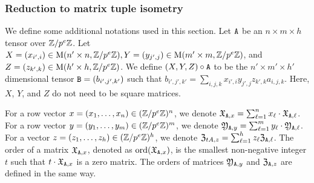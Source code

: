 \subsubsection{Reduction to matrix tuple isometry}

We define some additional notations used in this section. 
Let $\mathtt{A}$ be an $n \times m \times h$ tensor over $\mathbb{Z} / p^e \mathbb{Z}$. 
Let $X = (x_{i', i})\in \mathrm{M}(n'\times n, \mathbb{Z}/ p^e \mathbb{Z}), Y = (y_{j', j}) \in \mathrm{M}(m'\times m, \mathbb{Z}/ p^e \mathbb{Z})$, and $Z = (z_{k', k}) \in \mathrm{M}(h'\times h, \mathbb{Z} / p^e \mathbb{Z})$. 
We define $(X, Y, Z)\circ \mathtt{A}$ to be the $n' \times m' \times h'$ dimensional tensor $\mathtt{B} = (b_{i', j' ,k'})$ such that
$b_{i', j', k'} = \sum_{i, j, k} x_{i', i} y_{j', j} z_{k', k} a_{i, j, k}$. 
Here, $X$, $Y$, and $Z$ do not need to be square matrices.  



For a row vector $x = (x_1, \dots, x_n) \in (\mathbb{Z} / p^{e} \mathbb{Z})^n$, we denote $\mathfrak{X}_{\mathtt{A}, x} = \sum_{\ell = 1}^n x_\ell \cdot \mathfrak{X}_{\mathtt{A}, \ell}$.
For a row vector $y = (y_1, \dots, y_m) \in (\mathbb{Z} / p^{e} \mathbb{Z})^m$, we denote $\mathfrak{Y}_{\mathtt{A}, y} = \sum_{\ell = 1}^m y_\ell \cdot \mathfrak{Y}_{\mathtt{A}, \ell}$.
For a vector $z = (z_1, \dots, z_h) \in (\mathbb{Z} / p^{e} \mathbb{Z})^h$, we denote $\mathfrak{Z}_{tA, z} = \sum_{\ell = 1}^h z_\ell \mathfrak{Z}_{\mathtt{A}, \ell}$.
The order of a matrix $\mathfrak{X}_{\mathtt{A}, x}$, denoted as $\mathrm{ord}(\mathfrak{X}_{\mathtt{A}, x})$, is the smallest non-negative integer $t$ such that 
$t \cdot \mathfrak{X}_{\mathtt{A}, x}$ is a zero matrix. 
The orders of matrices $\mathfrak{Y}_{\mathtt{A}, y}$ and $\mathfrak{Z}_{\mathtt{A}, z}$ are defined in the same way. 

